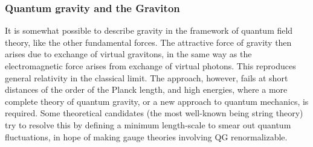 \subsubsection{Quantum gravity and the Graviton}
It is somewhat possible to describe gravity in the framework of quantum field theory, like the other fundamental forces. The attractive force of gravity then arises due to exchange of virtual gravitons, in the same way as the electromagnetic force arises from exchange of virtual photons. This reproduces general relativity in the classical limit. The approach, however, fails at short distances of the order of the Planck length, and high energies, where a more complete theory of quantum gravity, or a new approach to quantum mechanics, is required. Some theoretical candidates (the most well-known being string theory) try to resolve this by defining a minimum length-scale to smear out quantum fluctuations, in hope of making gauge theories involving QG renormalizable.
